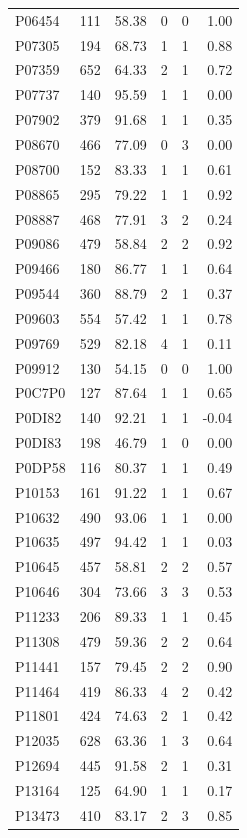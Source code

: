 \begin{longtable}{lrrrrr}
P06454 & 111 & 58.38 & 0 & 0 & 1.00 \\
P07305 & 194 & 68.73 & 1 & 1 & 0.88 \\
P07359 & 652 & 64.33 & 2 & 1 & 0.72 \\
P07737 & 140 & 95.59 & 1 & 1 & 0.00 \\
P07902 & 379 & 91.68 & 1 & 1 & 0.35 \\
P08670 & 466 & 77.09 & 0 & 3 & 0.00 \\
P08700 & 152 & 83.33 & 1 & 1 & 0.61 \\
P08865 & 295 & 79.22 & 1 & 1 & 0.92 \\
P08887 & 468 & 77.91 & 3 & 2 & 0.24 \\
P09086 & 479 & 58.84 & 2 & 2 & 0.92 \\
P09466 & 180 & 86.77 & 1 & 1 & 0.64 \\
P09544 & 360 & 88.79 & 2 & 1 & 0.37 \\
P09603 & 554 & 57.42 & 1 & 1 & 0.78 \\
P09769 & 529 & 82.18 & 4 & 1 & 0.11 \\
P09912 & 130 & 54.15 & 0 & 0 & 1.00 \\
P0C7P0 & 127 & 87.64 & 1 & 1 & 0.65 \\
P0DI82 & 140 & 92.21 & 1 & 1 & -0.04 \\
P0DI83 & 198 & 46.79 & 1 & 0 & 0.00 \\
P0DP58 & 116 & 80.37 & 1 & 1 & 0.49 \\
P10153 & 161 & 91.22 & 1 & 1 & 0.67 \\
P10632 & 490 & 93.06 & 1 & 1 & 0.00 \\
P10635 & 497 & 94.42 & 1 & 1 & 0.03 \\
P10645 & 457 & 58.81 & 2 & 2 & 0.57 \\
P10646 & 304 & 73.66 & 3 & 3 & 0.53 \\
P11233 & 206 & 89.33 & 1 & 1 & 0.45 \\
P11308 & 479 & 59.36 & 2 & 2 & 0.64 \\
P11441 & 157 & 79.45 & 2 & 2 & 0.90 \\
P11464 & 419 & 86.33 & 4 & 2 & 0.42 \\
P11801 & 424 & 74.63 & 2 & 1 & 0.42 \\
P12035 & 628 & 63.36 & 1 & 3 & 0.64 \\
P12694 & 445 & 91.58 & 2 & 1 & 0.31 \\
P13164 & 125 & 64.90 & 1 & 1 & 0.17 \\
P13473 & 410 & 83.17 & 2 & 3 & 0.85 \\

\end{longtable}
